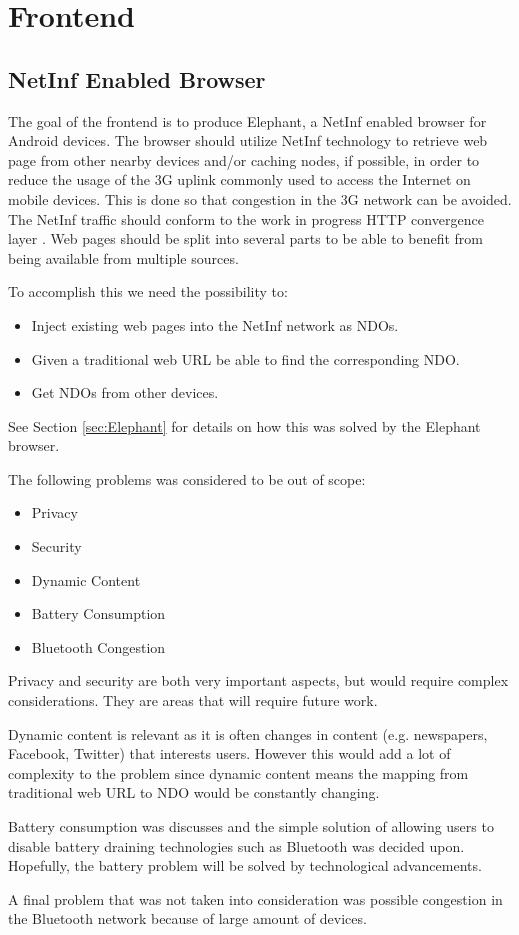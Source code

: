\section{Frontend}

\subsection{NetInf Enabled Browser}

The goal of the frontend is to produce Elephant, a NetInf enabled browser for Android devices. The browser should utilize NetInf technology to retrieve web page from other nearby devices and/or caching nodes, if possible, in order to reduce the usage of the 3G uplink commonly used to access the Internet on mobile devices. This is done so that congestion in the 3G network can be avoided. The NetInf traffic should conform to the work in progress HTTP convergence layer \cite{netinfproto}. Web pages should be split into several parts to be able to benefit from being available from multiple sources.

To accomplish this we need the possibility to:

\begin{itemize}
	\item Inject existing web pages into the NetInf network as NDOs.
	\item Given a traditional web URL be able to find the corresponding NDO.
	\item Get NDOs from other devices.
\end{itemize}

See Section \ref{sec:Elephant} for details on how this was solved by the Elephant browser.

The following problems was considered to be out of scope:

\begin{itemize}
	\item Privacy
	\item Security
	\item Dynamic Content
	\item Battery Consumption
	\item Bluetooth Congestion
\end{itemize}

Privacy and security are both very important aspects, but would require complex considerations. They are areas that will require future work.

Dynamic content is relevant as it is often changes in content (e.g. newspapers, Facebook, Twitter) that interests users. However this would add a lot of complexity to the problem since dynamic content means the mapping from traditional web URL to NDO would be constantly changing.

Battery consumption was discusses and the simple solution of allowing users to disable battery draining technologies such as Bluetooth was decided upon. Hopefully, the battery problem will be solved by technological advancements.

A final problem that was not taken into consideration was possible congestion in the Bluetooth network because of large amount of devices.